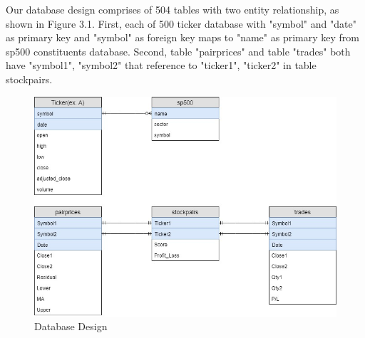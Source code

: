 Our database design comprises of 504 tables with two entity relationship, as shown in Figure 3.1. First, each of 500 ticker database with "symbol" and "date" as primary key and "symbol" as foreign key maps to "name" as primary key from sp500 constituents database. Second, table "pairprices" and table "trades" both have "symbol1", "symbol2" that reference to "ticker1", "ticker2" in table stockpairs.

\begin{figure}[h!]
\centering
\includegraphics[scale=0.45]{data/images/database.jpg}
\caption{Database Design}
\label{fig:database}
\end{figure}